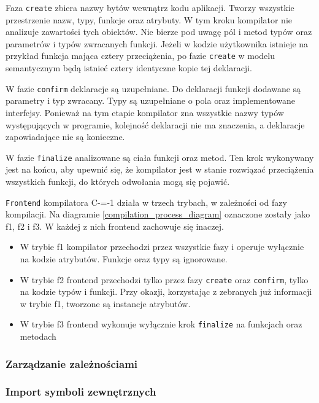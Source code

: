 Faza \lstinline{create} zbiera nazwy bytów wewnątrz kodu aplikacji.
Tworzy wszystkie przestrzenie nazw, typy, funkcje oraz atrybuty.
W tym kroku kompilator nie analizuje zawartości tych obiektów.
Nie bierze pod uwagę pól i metod typów oraz parametrów i typów zwracanych funkcji.
Jeżeli w kodzie użytkownika istnieje na przykład funkcja mająca cztery przeciążenia, po fazie \lstinline{create} w modelu semantycznym będą istnieć cztery identyczne kopie tej deklaracji.

W fazie \lstinline{confirm} deklaracje są uzupełniane.
Do deklaracji funkcji dodawane są parametry i typ zwracany.
Typy są uzupełniane o pola oraz implementowane interfejsy.
Ponieważ na tym etapie kompilator zna wszystkie nazwy typów występujących w programie, kolejność deklaracji nie ma znaczenia, a deklaracje zapowiadające nie są konieczne.

W fazie \lstinline{finalize}
analizowane są ciała funkcji oraz metod.
Ten krok wykonywany jest na końcu, aby upewnić się, że kompilator jest w stanie rozwiązać przeciążenia wszystkich funkcji, do których odwołania mogą się pojawić.

\lstinline{Frontend} kompilatora C-=-1 działa w trzech trybach, w zależności od fazy kompilacji.
Na diagramie \ref{compilation_process_diagram} oznaczone zostały jako f1, f2 i f3.
W każdej z nich frontend zachowuje się inaczej.
\begin{itemize}
    \item W trybie f1 kompilator przechodzi przez wszystkie fazy i operuje wyłącznie na kodzie atrybutów.
    Funkcje oraz typy są ignorowane.
    \item W trybie f2 frontend przechodzi tylko przez fazy \lstinline{create} oraz \lstinline{confirm}, tylko na kodzie typów i funkcji.
    Przy okazji, korzystając z zebranych już informacji w trybie f1, tworzone są instancje atrybutów.
    \item W trybie f3 frontend wykonuje wyłącznie krok \lstinline{finalize} na funkcjach oraz metodach
\end{itemize}


\subsubsection{Zarządzanie zależnościami}

\subsubsection{Import symboli zewnętrznych}

